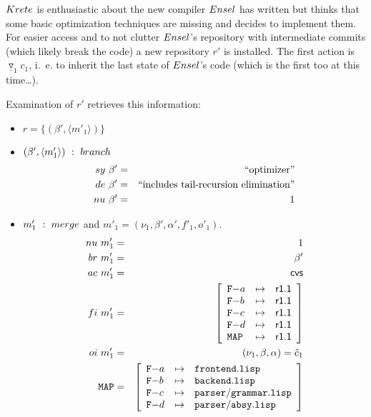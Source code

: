 \documentclass[fleqn, 10pt, a4paper]{report} \usepackage{amssymb}
\begin{document}
$\mathnormal{Krete}$ is enthusiastic about the new compiler
$\mathnormal{Ensel}$ has written but thinks that some basic
optimization techniques are missing and decides to implement them. For
easier access and to not clutter $\mathnormal{Ensel}$'s repository
with intermediate commits (which likely break the code) a new
repository $r'$ is installed. The first action is
$\underline{\triangledown}_1 c_1$, i.~e. to inherit the last state of
$\mathnormal{Ensel}$'s code (which is the first too at this
time\ldots).

Examination of $r'$ retrieves this information:

\begin{itemize}
\item $r=\{(\beta', \langle m'_1\rangle)\}$
\item $(\beta',\langle m'_1\rangle)\ :\ \mathnormal{branch}$
  \begin{eqnarray*}
    \mathnormal{sy}\ \beta' &=& \mbox{``optimizer''} \\
    \mathnormal{de}\ \beta' &=& \mbox{``includes tail-recursion elimination''} \\
    \mathnormal{nu}\ \beta' &=& 1
  \end{eqnarray*}

\item $m'_1\ :\ \mathnormal{merge}$ and $m'_1=(\nu_1, \beta', \alpha',
  f'_1, o'_1)$.
  \begin{eqnarray*}
    \mathnormal{nu}\ m'_1 &=& 1 \\
    \mathnormal{br}\ m'_1 &=& \beta' \\
    \mathnormal{ac}\ m'_1 &=& \mathsf{cvs} \\
    \mathnormal{fi}\ m'_1 &=& \left[
      \begin{array}{lcl}
        \mathtt{F-}a & \mapsto & \mathsf{r1.1} \\
        \mathtt{F-}b & \mapsto & \mathsf{r1.1} \\
        \mathtt{F-}c & \mapsto & \mathsf{r1.1} \\
        \mathtt{F-}d & \mapsto & \mathsf{r1.1} \\
        \mathtt{MAP} & \mapsto & \mathsf{r1.1} \\
      \end{array}\right] \\
    \mathnormal{oi}\ m'_1 &=& (\nu_1, \beta, \alpha) = \hat c_1 \\
    \mathtt{MAP} &=& \left[
      \begin{array}{lcl}
        \mathtt{F-}a &\mapsto& \mathtt{frontend.lisp} \\
        \mathtt{F-}b &\mapsto& \mathtt{backend.lisp} \\
        \mathtt{F-}c &\mapsto& \mathtt{parser/grammar.lisp} \\
        \mathtt{F-}d &\mapsto& \mathtt{parser/absy.lisp} \\
      \end{array}\right]
  \end{eqnarray*}
\end{itemize}
\end{document}
